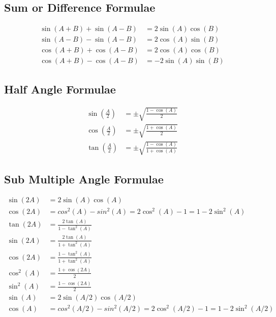 \subsection{Sum or Difference Formulae}
\begin{align*}
\sin(A+B) + \sin(A-B) &=  2\sin(A)\cos(B)\\
\sin(A-B) - \sin(A-B) &=  2\cos(A)\sin(B)\\  
\cos(A+B) + \cos(A-B) &=  2\cos(A)\cos(B)\\   
\cos(A+B) - \cos(A-B) &= -2\sin(A)\sin(B)   
\end{align*}

\subsection{Half Angle Formulae}
\begin{align*}
\sin (\frac{A}{2}) &= \pm\sqrt{\frac{1-\cos(A)}{2}}\\
\cos (\frac{A}{2}) &= \pm\sqrt{\frac{1+\cos(A)}{2}}\\
\tan (\frac{A}{2}) &= \pm\sqrt{\frac{1-\cos(A)}{1+\cos(A)}}
\end{align*}

\subsection{Sub Multiple Angle Formulae}
\begin{align*}
\sin (2A) &= 2\sin(A)\cos(A)\\
\cos (2A) &= cos^{2}(A) - sin^{2}(A) = 2\cos^2(A) - 1 = 1 - 2\sin^2(A)\\
\tan(2A) &= \frac{2\tan(A)}{1-\tan^2(A)}\\
\sin(2A) &= \frac{2\tan(A)}{1+\tan^2(A)}\\
\cos(2A) &= \frac{1-\tan^2(A)}{1+\tan^2(A)}\\
\cos^2(A) &= \frac{1+\cos(2A)}{2}\\
\sin^2(A) &= \frac{1-\cos(2A)}{2}\\
\sin(A) &= 2\sin(A/2)\cos(A/2)\\
\cos (A) &= cos^{2}(A/2) - sin^{2}(A/2) = 2\cos^2(A/2) - 1 = 1 - 2\sin^2(A/2)
\end{align*}

